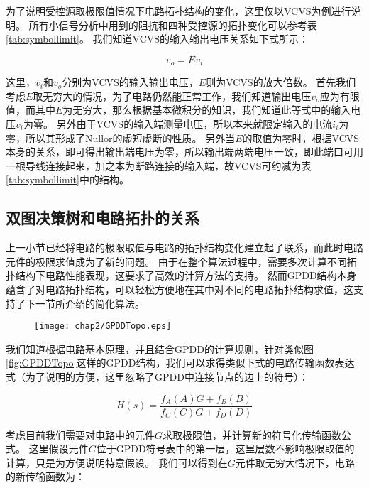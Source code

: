 为了说明受控源取极限值情况下电路拓扑结构的变化，这里仅以VCVS为例进行说明。
所有小信号分析中用到的阻抗和四种受控源的拓扑变化可以参考表\ref{tab:symbollimit}。
我们知道VCVS的输入输出电压关系如下式所示：

\begin{equation}
	v_o = E v_i
\end{equation}

这里，$v_i$和$v_o$分别为VCVS的输入输出电压，$E$则为VCVS的放大倍数。
首先我们考虑$E$取无穷大的情况，为了电路仍然能正常工作，我们知道输出电压$v_o$应为有限值，而其中$E$为无穷大，那么根据基本微积分的知识，我们知道此等式中的输入电压$v_i$为零。
另外由于VCVS的输入端测量电压，所以本来就限定输入的电流$i_i$为零，所以其形成了Nullor的虚短虚断的性质。
另外当$E$的取值为零时，根据VCVS本身的关系，即可得出输出端电压为零，所以输出端两端电压一致，即此端口可用一根导线连接起来，加之本为断路连接的输入端，故VCVS可约减为表\ref{tab:symbollimit}中的结构。

\subsection{双图决策树和电路拓扑的关系}
\label{subsec:simp:GPDD:TopoGPDD}

上一小节已经将电路的极限取值与电路的拓扑结构变化建立起了联系，而此时电路元件的极限求值成为了新的问题。
由于在整个算法过程中，需要多次计算不同拓扑结构下电路性能表现，这要求了高效的计算方法的支持。
然而GPDD结构本身蕴含了对电路拓扑结构，可以轻松方便地在其中对不同的电路拓扑结构求值，这支持了下一节所介绍的简化算法。

\begin{figure}[!htp]
	\centering
	\texttt{[image: chap2/GPDDTopo.eps]}
\end{figure}

我们知道根据电路基本原理，并且结合GPDD的计算规则，针对类似图\ref{fig:GPDDTopo}这样的GPDD结构，我们可以求得类似下式的电路传输函数表达式（为了说明的方便，这里忽略了GPDD中连接节点的边上的符号）：

\begin{equation}
H \left( s \right) = \frac{{{f_A}\left( A \right)G + {f_B}\left( B \right)}}{{{f_C}\left( C \right)G + {f_D}\left( D \right)}}
\end{equation}

考虑目前我们需要对电路中的元件$G$求取极限值，并计算新的符号化传输函数公式。
这里假设元件$G$位于GPDD符号表中的第一层，这里层数不影响极限取值的计算，只是为方便说明特意假设。
我们可以得到在$G$元件取无穷大情况下，电路的新传输函数为：

